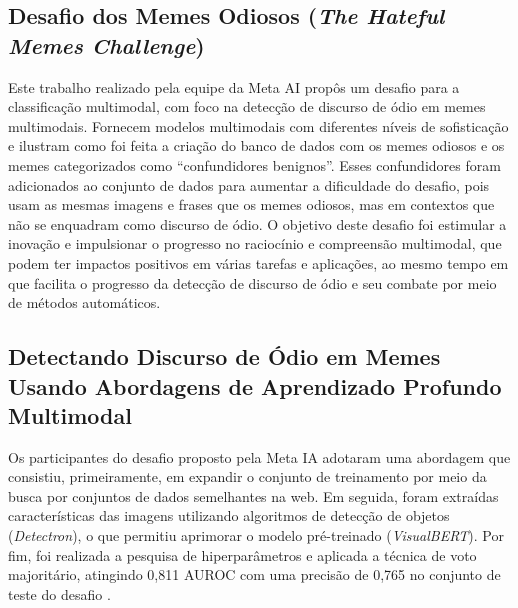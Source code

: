 \subsection{Desafio dos Memes Odiosos (\textit{The Hateful Memes Challenge})} 

Este trabalho realizado pela equipe da Meta AI \cite{ArticleHatefulMemesChallenge2021} propôs um desafio para a classificação multimodal, com foco na detecção de discurso de ódio em memes multimodais. Fornecem modelos multimodais com diferentes níveis de sofisticação e ilustram como foi feita a criação do banco de dados com os memes odiosos e os memes categorizados como “confundidores benignos”. Esses confundidores foram adicionados ao conjunto de dados para aumentar a dificuldade do desafio, pois usam as mesmas imagens e frases que os memes odiosos, mas em contextos que não se enquadram como discurso de ódio. O objetivo deste desafio foi estimular a inovação e impulsionar o progresso no raciocínio e compreensão multimodal, que podem ter impactos positivos em várias tarefas e aplicações, ao mesmo tempo em que facilita o progresso da detecção de discurso de ódio e seu combate por meio de métodos automáticos.

\subsection{Detectando Discurso de Ódio em Memes Usando Abordagens de Aprendizado Profundo Multimodal} 

Os participantes do desafio proposto pela Meta IA adotaram uma abordagem que consistiu, primeiramente, em expandir o conjunto de treinamento por meio da busca por conjuntos de dados semelhantes na web. Em seguida, foram extraídas características das imagens utilizando algoritmos de detecção de objetos (\textit{Detectron}), o que permitiu aprimorar o modelo pré-treinado (\textit{VisualBERT}). Por fim, foi realizada a pesquisa de hiperparâmetros e aplicada a técnica de voto majoritário, atingindo 0,811 AUROC com uma precisão de 0,765 no conjunto de teste do desafio \cite{velioglu2020hateful}.